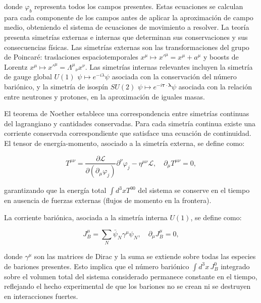 donde $\varphi_b$ representa todos los campos presentes. Estas ecuaciones se calculan para cada componente de los campos antes de aplicar la aproximación de campo medio, obteniendo el sistema de ecuaciones de movimiento a resolver. La teoría presenta simetrías externas e internas que determinan sus conservaciones y sus consecuencias físicas. Las simetrías externas son las transformaciones del grupo de Poincaré: traslaciones espaciotemporales $x^\mu \mapsto x'^\mu = x^\mu + a^\mu$ y boosts de Lorentz $x^\mu \mapsto x'^\mu = \Lambda^\mu{}_\nu x^\nu$. Las simetrías internas relevantes incluyen la simetría de gauge global $U(1)$ $\psi \mapsto e^{-i\lambda}\psi$ asociada con la conservación del número bariónico, y la simetría de isospín $SU(2)$ $\psi \mapsto e^{-i\boldsymbol{\tau}\cdot\boldsymbol{\lambda}}\psi$ asociada con la relación entre neutrones y protones, en la aproximación de iguales masas.

El teorema de Noether establece una correspondencia entre simetrías continuas del lagrangiano y cantidades conservadas. Para cada simetría continua existe una corriente conservada correspondiente que satisface una ecuación de continuidad. El tensor de energía-momento, asociado a la simetría externa, se define como:

\begin{equation}
	T^{\mu\nu} = \frac{\partial \mathcal{L}}{\partial (\partial_\mu \varphi_j)} \partial^\nu \varphi_j - \eta^{\mu\nu} \mathcal{L}, \quad \partial_\mu T^{\mu\nu} = 0,
	\label{eq:tensor_energia_momento}
\end{equation}

garantizando que la energía total $\int d^3x T^{00}$ del sistema se conserve en el tiempo en ausencia de fuerzas externas (flujos de momento en la frontera).

La corriente bariónica, asociada a la simetría interna $U(1)$, se define como:

\begin{equation}
	J_B^\mu = \sum_N \bar{\psi}_N \gamma^\mu \psi_N, \quad \partial_\mu J_B^\mu = 0,
	\label{eq:corriente_barionica}
\end{equation}

donde $\gamma^\mu$ son las matrices de Dirac y la suma se extiende sobre todas las especies de bariones presentes. Esto implica que el número bariónico $\int d^3x \, J_B^0$ integrado sobre el volumen total del sistema considerado permanece constante en el tiempo, reflejando el hecho experimental de que los bariones no se crean ni se destruyen en interacciones fuertes.


